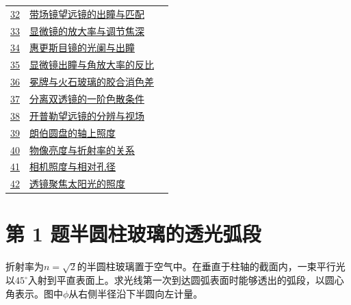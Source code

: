 \documentclass[UTF8,fontset=fandol,a4paper,11pt]{ctexart}
\begin{document}
\begin{longtable}{@{}r p{113mm} r@{}}
\hyperref[q:32]{32} & \hyperref[q:32]{带场镜望远镜的出瞳与匹配} & \pageref{q:32} \\

\hyperref[q:33]{33} & \hyperref[q:33]{显微镜的放大率与调节焦深} & \pageref{q:33} \\

\hyperref[q:34]{34} & \hyperref[q:34]{惠更斯目镜的光阑与出瞳} & \pageref{q:34} \\

\hyperref[q:35]{35} & \hyperref[q:35]{显微镜出瞳与角放大率的反比} & \pageref{q:35} \\

\hyperref[q:36]{36} & \hyperref[q:36]{冕牌与火石玻璃的胶合消色差} & \pageref{q:36} \\

\hyperref[q:37]{37} & \hyperref[q:37]{分离双透镜的一阶色散条件} & \pageref{q:37} \\

\hyperref[q:38]{38} & \hyperref[q:38]{开普勒望远镜的分辨与视场} & \pageref{q:38} \\

\hyperref[q:39]{39} & \hyperref[q:39]{朗伯圆盘的轴上照度} & \pageref{q:39} \\

\hyperref[q:40]{40} & \hyperref[q:40]{物像亮度与折射率的关系} & \pageref{q:40} \\

\hyperref[q:41]{41} & \hyperref[q:41]{相机照度与相对孔径} & \pageref{q:41} \\

\hyperref[q:42]{42} & \hyperref[q:42]{透镜聚焦太阳光的照度} & \pageref{q:42} \\

\bottomrule\end{longtable}

\clearpage


\section*{第 1 题\quad 半圆柱玻璃的透光弧段}\label{q:1}

折射率为$n=\sqrt2$的半圆柱玻璃置于空气中。在垂直于柱轴的截面内，一束平行光以$45^\circ$入射到平直表面上。求光线第一次到达圆弧表面时能够透出的弧段，以圆心角表示。图中$\phi$从右侧半径沿下半圆向左计量。
\end{document}
